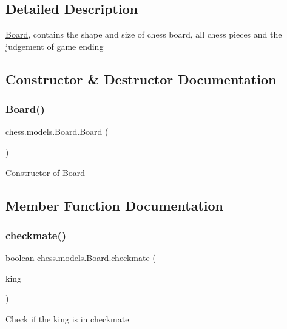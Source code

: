 \subsection{Detailed Description}
\mbox{\hyperlink{classchess_1_1models_1_1_board}{Board}}, contains the shape and size of chess board, all chess pieces and the judgement of game ending 

\subsection{Constructor \& Destructor Documentation}
\mbox{\label{classchess_1_1models_1_1_board_a742cb1aaa3ec12625098a4ddf24fee19}} 
\subsubsection{\texorpdfstring{Board()}{Board()}}
{\footnotesize\ttfamily chess.\+models.\+Board.\+Board (\begin{DoxyParamCaption}{ }\end{DoxyParamCaption})}

Constructor of \mbox{\hyperlink{classchess_1_1models_1_1_board}{Board}} 

\subsection{Member Function Documentation}
\mbox{\label{classchess_1_1models_1_1_board_a7268e3609f458bc8acd92b43727ca63d}} 
\subsubsection{\texorpdfstring{checkmate()}{checkmate()}}
{\footnotesize\ttfamily boolean chess.\+models.\+Board.\+checkmate (\begin{DoxyParamCaption}\item[{\mbox{\hyperlink{classchess_1_1models_1_1_chess_piece}{Chess\+Piece}}}]{king }\end{DoxyParamCaption})}

Check if the king is in checkmate


